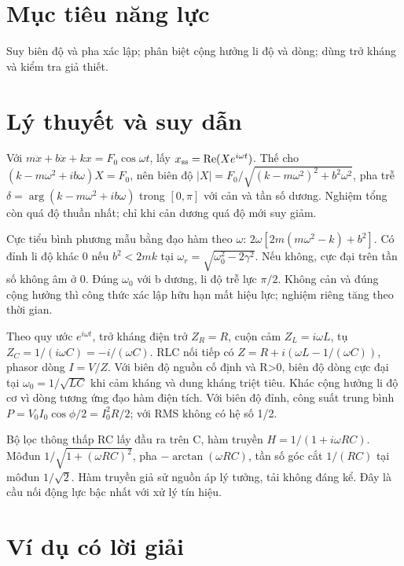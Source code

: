 \documentclass[11pt,a4paper,openany]{book}
\begin{document}
\section{Mục tiêu năng lực}
Suy biên độ và pha xác lập; phân biệt cộng hưởng li độ và dòng; dùng trở kháng và kiểm tra giả thiết.
\section{Lý thuyết và suy dẫn}
Với $m\ddot x+b\dot x+kx=F_0\cos\omega t$, lấy $x_{\rm ss}=\operatorname{Re}(Xe^{i\omega t})$. Thế cho $(k-m\omega^2+ib\omega)X=F_0$, nên biên độ $|X|=F_0/\sqrt{(k-m\omega^2)^2+b^2\omega^2}$, pha trễ $\delta=\arg(k-m\omega^2+ib\omega)$ trong $[0,\pi]$ với cản và tần số dương. Nghiệm tổng còn quá độ thuần nhất; chỉ khi cản dương quá độ mới suy giảm.

Cực tiểu bình phương mẫu bằng đạo hàm theo $\omega$: $2\omega[2m(m\omega^2-k)+b^2]$. Có đỉnh li độ khác 0 nếu $b^2<2mk$ tại $\omega_r=\sqrt{\omega_0^2-2\gamma^2}$. Nếu không, cực đại trên tần số không âm ở 0. Đúng $\omega_0$ với b dương, li độ trễ lực $\pi/2$. Không cản và đúng cộng hưởng thì công thức xác lập hữu hạn mất hiệu lực; nghiệm riêng tăng theo thời gian.

Theo quy ước $e^{i\omega t}$, trở kháng điện trở $Z_R=R$, cuộn cảm $Z_L=i\omega L$, tụ $Z_C=1/(i\omega C)=-i/(\omega C)$. RLC nối tiếp có $Z=R+i(\omega L-1/(\omega C))$, phasor dòng $I=V/Z$. Với biên độ nguồn cố định và R>0, biên độ dòng cực đại tại $\omega_0=1/\sqrt{LC}$ khi cảm kháng và dung kháng triệt tiêu. Khác cộng hưởng li độ cơ vì dòng tương ứng đạo hàm điện tích. Với biên độ đỉnh, công suất trung bình $P=V_0I_0\cos\phi/2=I_0^2R/2$; với RMS không có hệ số 1/2.

Bộ lọc thông thấp RC lấy đầu ra trên C, hàm truyền $H=1/(1+i\omega RC)$. Môđun $1/\sqrt{1+(\omega RC)^2}$, pha $-\arctan(\omega RC)$, tần số góc cắt $1/(RC)$ tại môđun $1/\sqrt2$. Hàm truyền giả sử nguồn áp lý tưởng, tải không đáng kể. Đây là cầu nối động lực bậc nhất với xử lý tín hiệu.
\begin{center}
\end{center}
\section{Ví dụ có lời giải}
\end{document}
